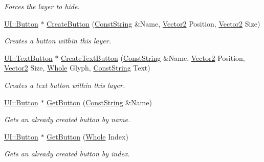 \begin{DoxyCompactItemize}
\begin{DoxyCompactList}\small\item\em Forces the layer to hide. \item\end{DoxyCompactList}\item 
\hyperlink{classphys_1_1UI_1_1Button}{UI::Button} $\ast$ \hyperlink{classphys_1_1UILayer_a270b0e2e2d7e48efe0df54f769f930e4}{CreateButton} (\hyperlink{namespacephys_a5ce5049f8b4bf88d6413c47b504ebb31}{ConstString} \&Name, \hyperlink{classphys_1_1Vector2}{Vector2} Position, \hyperlink{classphys_1_1Vector2}{Vector2} Size)
\begin{DoxyCompactList}\small\item\em Creates a button within this layer. \item\end{DoxyCompactList}\item 
\hyperlink{classphys_1_1UI_1_1TextButton}{UI::TextButton} $\ast$ \hyperlink{classphys_1_1UILayer_a734a98ef447b774cae7fd386e0624710}{CreateTextButton} (\hyperlink{namespacephys_a5ce5049f8b4bf88d6413c47b504ebb31}{ConstString} \&Name, \hyperlink{classphys_1_1Vector2}{Vector2} Position, \hyperlink{classphys_1_1Vector2}{Vector2} Size, \hyperlink{namespacephys_a460f6bc24c8dd347b05e0366ae34f34a}{Whole} Glyph, \hyperlink{namespacephys_a5ce5049f8b4bf88d6413c47b504ebb31}{ConstString} Text)
\begin{DoxyCompactList}\small\item\em Creates a text button within this layer. \item\end{DoxyCompactList}\item 
\hyperlink{classphys_1_1UI_1_1Button}{UI::Button} $\ast$ \hyperlink{classphys_1_1UILayer_ace0f4fa9270b252dd593212182d43ebf}{GetButton} (\hyperlink{namespacephys_a5ce5049f8b4bf88d6413c47b504ebb31}{ConstString} \&Name)
\begin{DoxyCompactList}\small\item\em Gets an already created button by name. \item\end{DoxyCompactList}\item 
\hyperlink{classphys_1_1UI_1_1Button}{UI::Button} $\ast$ \hyperlink{classphys_1_1UILayer_a98acc74c401ba1b28c53f1ea8966b950}{GetButton} (\hyperlink{namespacephys_a460f6bc24c8dd347b05e0366ae34f34a}{Whole} Index)
\begin{DoxyCompactList}\small\item\em Gets an already created button by index. \item\end{DoxyCompactList}\item 

\end{DoxyCompactItemize}
